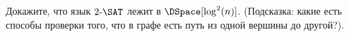 Докажите, что язык $2\text{-}\SAT$ лежит в ${\DSpace}[\log^2(n)]$. (Подсказка: какие есть способы проверки того, что в графе
есть путь из одной вершины до другой?).